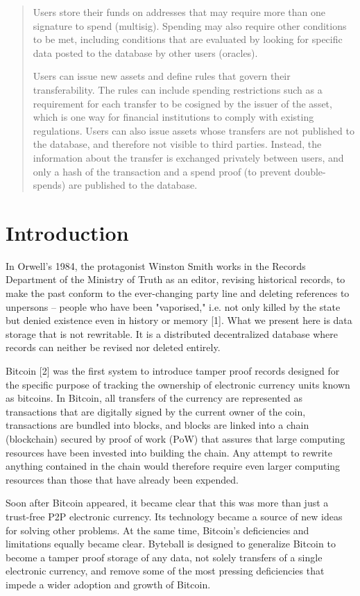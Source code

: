 \documentclass[a4paper, dvipdfmx]{jsarticle}
\begin{document}
\begin{abstract}
Users store their funds on addresses that may require more than one signature to spend (multisig). Spending may also require other conditions to be met, including conditions that are evaluated by looking for specific data posted to the database by other users (oracles).

Users can issue new assets and define rules that govern their transferability. The rules can include spending restrictions such as a requirement for each transfer to be cosigned by the issuer of the asset, which is one way for financial institutions to comply with existing regulations. Users can also issue assets whose transfers are not published to the database, and therefore not visible to third parties. Instead, the information about the transfer is exchanged privately between users, and only a hash of the transaction and a spend proof (to prevent double-spends) are published to the database.

\end{abstract}

\newpage
\section{Introduction}
In Orwell’s 1984, the protagonist Winston Smith works in the Records Department of the Ministry of Truth as an editor, revising historical records, to make the past conform to the ever-changing party line and deleting references to unpersons – people who have been "vaporised," i.e. not only killed by the state but denied existence even in history or memory [1]. What we present here is data storage that is not rewritable. It is a distributed decentralized database where records can neither be revised nor deleted entirely.

Bitcoin [2] was the first system to introduce tamper proof records designed for the specific purpose of tracking the ownership of electronic currency units known as bitcoins. In Bitcoin, all transfers of the currency are represented as transactions that are digitally signed by the current owner of the coin, transactions are bundled into blocks, and blocks are linked into a chain (blockchain) secured by proof of work (PoW) that assures that large computing resources have been invested into building the chain. Any attempt to rewrite anything contained in the chain would therefore require even larger computing resources than those that have already been expended.

Soon after Bitcoin appeared, it became clear that this was more than just a trust-free P2P electronic currency. Its technology became a source of new ideas for solving other problems. At the same time, Bitcoin’s deficiencies and limitations equally became clear. Byteball is designed to generalize Bitcoin to become a tamper proof storage of any data, not solely transfers of a single electronic currency, and remove some of the most pressing deficiencies that impede a wider adoption and growth of Bitcoin.
\end{document}
